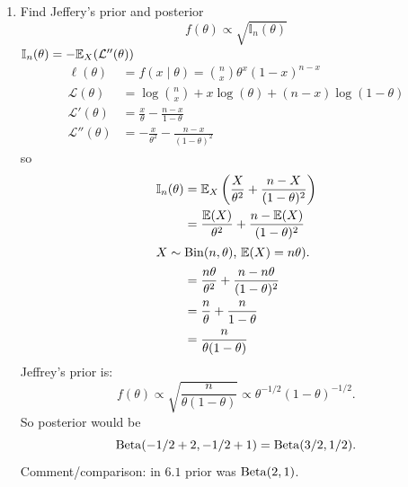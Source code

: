 \documentclass[10pt, a4paper]{article}
\begin{document}
\begin{problem}
\begin{solution}
\begin{enumerate}[label = 6.\arabic*]
            \item
            Find Jeffery's prior and posterior
            \[
            f(\theta) \propto \sqrt{\mathbb{I}_n(\theta)}
            \]
            $\mathbb{I}_n(\theta) = -\mathbb{E}_{X}(\mathcal{L}''(\theta))$
            \begin{align*}
                \ell(\theta) &= f(x\mid \theta) = \binom{n}{x}\theta ^ x(1 - x) ^ {n - x} \\
                \mathcal{L}(\theta) &= \log\binom{n}{x} + x\log(\theta) + (n - x)\log(1 - \theta) \\
                \mathcal{L}'(\theta) &= \frac{x}{\theta} - \frac{n - x}{1 - \theta} \\
                \mathcal{L}''(\theta) &= -\frac{x}{\theta ^ 2} - \frac{n - x}{(1 - \theta) ^ 2}
            \end{align*}
            so
            \begin{align*}
                \mathbb{I}_n(\theta) &= \mathbb{E}_{X}\left(\frac{X}{\theta ^ 2} + \frac{n - X}{(1 - \theta) ^ 2}\right) \\
                &= \frac{\mathbb{E}(X)}{\theta ^ 2} + \frac{n - \mathbb{E}(X)}{(1 - \theta) ^ 2} \\
                \intertext{$X \sim \operatorname{Bin}(n, \theta)$,
                $\mathbb{E}(X) = n\theta)$.}
                &= \frac{n\theta}{\theta ^ 2}  + \frac{n - n\theta}{(1 - \theta) ^ 2} \\
                &= \frac{n}{\theta} + \frac{n}{1 - \theta} \\
                &= \frac{n}{\theta(1 - \theta)}
            \end{align*}
            Jeffrey's prior is:
            \[
            f(\theta) \propto \sqrt{\frac{n}{\theta(1 - \theta)}} \propto \theta ^ {-1 / 2}(1 - \theta) ^ {-1 / 2}.
            \]
            So posterior would be
            \[
            \operatorname{Beta}(-1 / 2 + 2, - 1 / 2 + 1) = \operatorname{Beta}(3 / 2, 1 / 2).
            \]
            Comment/comparison:
            in $6.1$ prior was $\operatorname{Beta}(2, 1)$.


\end{enumerate}
\end{solution}
\end{problem}
\end{document}
